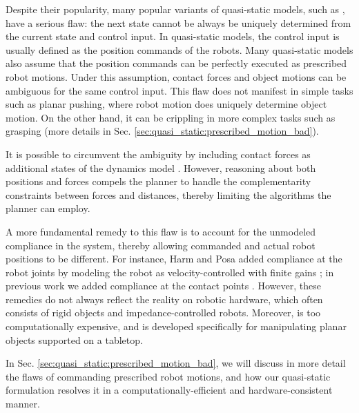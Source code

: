 Despite their popularity, many popular variants of quasi-static models, such as \cite{mason1986mechanics, lynch1996stable, zhou2017fast, hogan2020feedback}, have a serious flaw: the next state cannot be always be uniquely determined from the current state and control input.
In quasi-static models, the control input is usually defined as the position commands of the robots. 
Many quasi-static models also assume that the position commands can be perfectly executed as prescribed robot motions. Under this assumption, contact forces and object motions can be ambiguous for the same control input. This flaw does not manifest in simple tasks such as planar pushing, where robot motion does uniquely determine object motion. On the other hand, it can be crippling in more complex tasks such as grasping (more details in Sec. \ref{sec:quasi_static:prescribed_motion_bad}). 

It is possible to circumvent the ambiguity by including contact forces as additional states of the dynamics model \cite{trinkle1993dexterous, aydinoglu2020contact}. However, reasoning about both positions and forces compels the planner to handle the complementarity constraints between forces and distances, thereby limiting the algorithms the planner can employ.

A more fundamental remedy to this flaw is to account for the unmodeled compliance in the system, thereby allowing commanded and actual robot positions to be different. For instance, Harm and Posa added compliance at the robot joints by modeling the robot as velocity-controlled with finite gains \cite{halm2018quasi}; in previous work we added compliance at the contact points \cite{pang2018robust}. However, these remedies do not always reflect the reality on robotic hardware, which often consists of rigid objects and impedance-controlled robots. Moreover, \cite{pang2018robust} is too computationally expensive, and \cite{halm2018quasi} is developed specifically for manipulating planar objects supported on a tabletop.

In Sec. \ref{sec:quasi_static:prescribed_motion_bad}, we will discuss in more detail the flaws of commanding prescribed robot motions, and how our quasi-static formulation resolves it in a computationally-efficient and hardware-consistent manner. 


